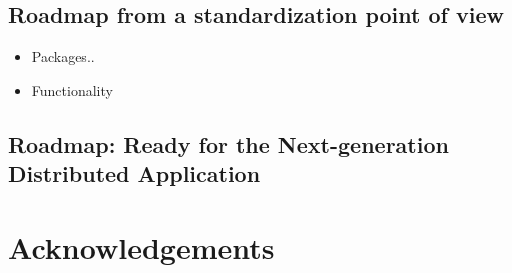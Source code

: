 \documentclass[10pt,letterpaper]{article}
\begin{document}
\subsection*{Roadmap from a standardization point of view}

\begin{itemize}
\item Packages.. 
\item Functionality
\end{itemize}

\subsection*{Roadmap: Ready for the Next-generation Distributed Application}

\section*{Acknowledgements}


%


\end{document}
